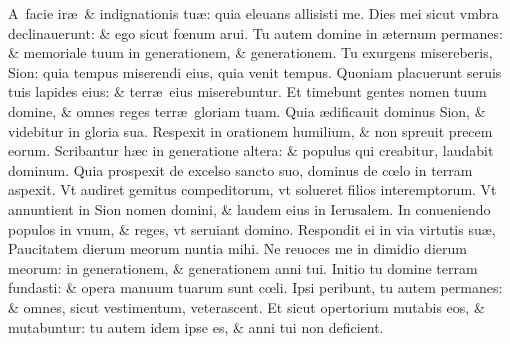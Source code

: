 \documentclass[a5paper,10pt]{book}
\def\ae{æ}
\def\oe{œ}
\begin{document}
\begin{multicols*}{2}
\newline \color{red} A\color{black}\ facie ir\ae \ \& indignationis tu\ae : quia eleuans allisisti me.
\newline \color{red} D\color{black}ies mei sicut vmbra declinauerunt: \& ego sicut f\oe num arui.
\newline \color{red} T\color{black}u autem domine in \ae ternum permanes: \& memoriale tuum in generationem, \& generationem.
\newline \color{red} T\color{black}u exurgens misereberis, Sion: quia tempus miserendi eius, quia venit tempus.
\newline \color{red} Q\color{black}uoniam placuerunt seruis tuis lapides eius: \& terr\ae \ eius miserebuntur.
\newline \color{red} E\color{black}t timebunt gentes nomen tuum domine, \& omnes reges terr\ae \ gloriam tuam.
\newline \color{red} Q\color{black}uia \ae dificauit dominus Sion, \& videbitur in gloria sua.
\newline \color{red} R\color{black}espexit in orationem humilium, \& non spreuit precem eorum.
\newline \color{red} S\color{black}cribantur h\ae c in generatione altera: \& populus qui creabitur, laudabit dominum.
\newline \color{red} Q\color{black}uia prospexit de excelso sancto suo, dominus de c\oe lo in terram aspexit.
\newline \color{red} V\color{black}t audiret gemitus compeditorum, vt solueret filios interemptorum.
\newline \color{red} V\color{black}t annuntient in Sion nomen domini, \& laudem eius in Ierusalem.
\newline \color{red} I\color{black}n conueniendo populos in vnum, \& reges, vt seruiant domino.
\newline \color{red} R\color{black}espondit ei in via virtutis su\ae , Paucitatem dierum meorum nuntia mihi.
\newline \color{red} N\color{black}e reuoces me in dimidio dierum meorum: in generationem, \& generationem anni tui.
\newline \color{red} I\color{black}nitio tu domine terram fundasti: \& opera manuum tuarum sunt c\oe li.
\newline \color{red} I\color{black}psi peribunt, tu autem permanes: \& omnes, sicut vestimentum, veterascent.
\newline \color{red} E\color{black}t sicut opertorium mutabis eos, \& mutabuntur: tu autem idem ipse es, \& anni tui non deficient.

\end{multicols*}
\end{document}
